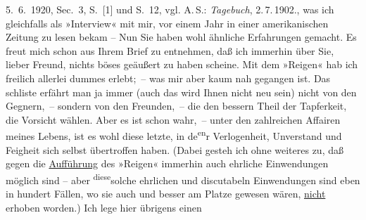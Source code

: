 \begin{ledgroupsized}[t]{13cm}
{{{                     5. 6. 1920, Sec. 3, S. [1] und S. 12, vgl. A. S.: \emph{Tagebuch}, 2. 7. 1902.}}}\label{K_L02376_1h}, was ich
               gleichfalls als »Interview« mit mir, vor einem Jahr in einer amerikanischen Zeitung zu lesen bekam – Nun Sie haben wohl
               ähnliche Erfahrungen gemacht. Es freut mich schon aus Ihrem Brief zu entnehmen, daß
               ich immerhin über {\pb}Sie, lieber Freund, nichts
               böses geäußert zu haben scheine.\pend
           \pstart
           Mit dem »Reigen« hab ich freilich allerlei dummes
               erlebt; – was mir aber kaum nah gegangen ist. Das schli{\geminationm}ste erfährt man ja immer (auch das wird Ihnen nicht neu sein) nicht von den
               Gegnern, – sondern von den Freunden, – die den bessern Theil der Tapferkeit, die
               Vorsicht wählen. Aber es ist schon wahr, – unter den zahlreichen Affairen meines
               Lebens, ist es wohl diese letzte, in de\substVorne{}\textsuperscript{en}\substDazwischen{}r\substHinten{} Verlogenheit, Unverstand und Feigheit sich selbst übertroffen haben. (Dabei
               gesteh ich ohne weiteres zu, daß gegen die \uline{Aufführung}
               des »Reigen« immerhin auch ehrliche Einwendungen
               möglich sind – aber \substVorne{}\textsuperscript{diese}\substDazwischen{}solche\substHinten{} ehrlichen und discutabeln Einwendungen sind eben in hundert Fällen, wo sie
               auch und besser am Platze gewesen wären, \uline{nicht}
               erhoben worden.) Ich lege hier übrigens einen \label{K_L02376_2v}
\end{ledgroupsized}
